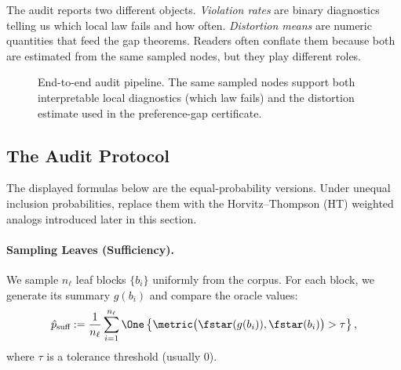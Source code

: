 The audit reports two different objects. \emph{Violation rates} are binary diagnostics telling us which local law fails and how often. \emph{Distortion means} are numeric quantities that feed the gap theorems. Readers often conflate them because both are estimated from the same sampled nodes, but they play different roles.

\begin{figure}[t]
\centering
{}
\caption{End-to-end audit pipeline. The same sampled nodes support both interpretable local diagnostics (which law fails) and the distortion estimate used in the preference-gap certificate.}
\label{fig:audit-pipeline}
\end{figure}

\subsection{The Audit Protocol}

The displayed formulas below are the equal-probability versions. Under unequal inclusion probabilities, replace them with the Horvitz--Thompson (HT) weighted analogs introduced later in this section.

\paragraph{Sampling Leaves (Sufficiency).}
We sample $n_\ell$ leaf blocks $\{b_i\}$ uniformly from the corpus. For each block, we generate its summary $g(b_i)$ and compare the oracle values:
\[
\hat{p}_{\text{suff}} := \frac{1}{n_\ell} \sum_{i=1}^{n_\ell} \One\left\{ \metric\big(\fstar(g(b_i)), \fstar(b_i)\big) > \tau \right\},
\]
where $\tau$ is a tolerance threshold (usually 0).

